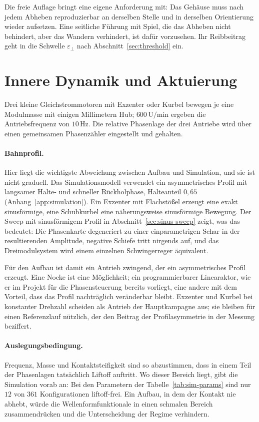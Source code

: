 \documentclass[12pt,a4paper]{report}
\begin{document}
Die freie Auflage bringt eine eigene Anforderung mit: Das Gehäuse muss
nach jedem Abheben reproduzierbar an derselben Stelle und in derselben
Orientierung wieder aufsetzen. Eine seitliche Führung mit Spiel, die
das Abheben nicht behindert, aber das Wandern verhindert, ist dafür
vorzusehen. Ihr Reibbeitrag geht in die Schwelle $\varepsilon_{\perp}$
nach Abschnitt~\ref{sec:threshold} ein.

\section{Innere Dynamik und Aktuierung}

Drei kleine Gleichstrommotoren mit Exzenter oder Kurbel bewegen je eine
Modulmasse mit einigen Millimetern Hub; $600\,\mathrm{U/min}$ ergeben die
Antriebsfrequenz von $10\,\mathrm{Hz}$. Die relative Phasenlage der drei
Antriebe wird über einen gemeinsamen Phasenzähler eingestellt und
gehalten.

\paragraph{Bahnprofil.}
Hier liegt die wichtigste Abweichung zwischen Aufbau und Simulation, und
sie ist nicht graduell. Das Simulationsmodell verwendet ein
asymmetrisches Profil mit langsamer Halte- und schneller Rückholphase,
Halteanteil $0{,}65$ (Anhang~\ref{app:simulation}). Ein Exzenter mit
Flachstößel erzeugt eine exakt sinusförmige, eine Schubkurbel eine
näherungsweise sinusförmige Bewegung. Der Sweep mit sinusförmigem Profil
in Abschnitt~\ref{sec:sinus-sweep} zeigt, was das bedeutet: Die
Phasenkarte degeneriert zu einer einparametrigen Schar in der
resultierenden Amplitude, negative Schiefe tritt nirgends auf, und das
Dreimodulsystem wird einem einzelnen Schwingerreger äquivalent.

Für den Aufbau ist damit ein Antrieb zwingend, der ein asymmetrisches
Profil erzeugt. Eine Nocke ist eine Möglichkeit; ein programmierbarer
Linearaktor, wie er im Projekt für die Phasensteuerung bereits vorliegt,
eine andere mit dem Vorteil, dass das Profil nachträglich veränderbar
bleibt. Exzenter und Kurbel bei konstanter Drehzahl scheiden als Antrieb
der Hauptkampagne aus; sie bleiben für einen Referenzlauf nützlich, der
den Beitrag der Profilasymmetrie in der Messung beziffert.

\paragraph{Auslegungsbedingung.}
Frequenz, Masse und Kontaktsteifigkeit sind so abzustimmen, dass in einem
Teil der Phasenlagen tatsächlich Liftoff auftritt. Wo dieser Bereich
liegt, gibt die Simulation vorab an: Bei den Parametern der
Tabelle~\ref{tab:sim-params} sind nur $12$ von $361$ Konfigurationen
liftoff-frei. Ein Aufbau, in dem der Kontakt nie abhebt, würde die
Wellenformfunktionale in einen schmalen Bereich zusammendrücken und die
Unterscheidung der Regime verhindern.
\end{document}
